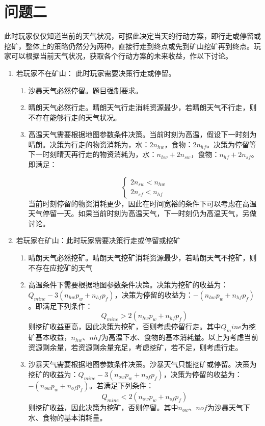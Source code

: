 \documentclass[withoutpre]{cumcmthesis} %
\begin{document}
\section{问题二}
此时玩家仅仅知道当前的天气状况，可据此决定当天的行动方案，即行走或停留或挖矿，整体上的策略仍然分为两种，直接行走到终点或先到矿山挖矿再到终点。玩家可以根据当前天气状况，获取各个行动方案的未来收益，作以下讨论。
\begin{enumerate}
    \item 若玩家不在矿山：
    此时玩家需要决策行走或停留。
    \begin{enumerate}
        \item 沙暴天气必然停留。题目强制要求。
        \item 晴朗天气必然行走。晴朗天气行走消耗资源最少，若晴朗天气不行走，则不存在能够行走的天气状况。
        \item 高温天气需要根据地图参数条件决策。当前时刻为高温，假设下一时刻为晴朗。决策为行走的物资消耗为，水：$2n_{hw}$，食物：$2n_{hf}$。决策为停留等下一时刻晴天再行走的物资消耗为，水：$n_{hw} + 2n_{sw}$，食物：$n_{hf} + 2n_{sf}$。即满足：

        \begin{equation}
            \left\{
                \begin{array}{lr}
                    2n_{sw} < n_{hw}   \\
                    2n_{sf} < n_{hf}
                \end{array}
            \right.
            \label{equa:1}
        \end{equation}
        当前时刻停留的物资消耗更少，因此在时间宽裕的条件下可以考虑在高温天气停留一天。如果当前时刻为高温天气，下一时刻仍为高温天气，另做讨论。
    \end{enumerate}
    \item 若玩家在矿山：此时玩家需要决策行走或停留或挖矿
    \begin{enumerate}
        \item 晴朗天气必然挖矿。晴朗天气挖矿消耗资源最少，若晴朗天气不挖矿，则不存在应挖矿的天气
        \item 高温条件下需要根据地图参数条件决策。决策为挖矿的收益为：$Q_{mine} - 3(n_{hw}p_w + n_{hf}p_f)$，决策为停留的收益为：$-(n_{hw}p_w + n_{hf}p_f)$。即满足下列条件：
        \begin{equation}
            Q_{mine} > 2(n_{hw}p_w + n_{hf}p_f)
            \label{equa:2}
        \end{equation}
        则挖矿收益更高，因此决策为挖矿，否则考虑停留行走。其中$Q_mine$为挖矿基本收益，$n_{hw}$、$n{hf}$为高温下水、食物的基本消耗量。以上为考虑当前资源剩余量，若资源剩余量充足，考虑挖矿，若不足，则考虑行走。
        \item 沙暴天气需要根据地图参数条件决策。沙暴天气只能挖矿或停留。决策为挖矿的收益为：$Q_{mine} - 3(n_{ow}p_w + n_{of}p_f)$，决策为停留的收益为：$-(n_{ow}p_w + n_{of}p_f)$。若满足下列条件：
        \begin{equation}
            Q_{mine} < 2(n_{ow}p_w + n_{of}p_f)
            \label{equa:3}
        \end{equation}
        则挖矿收益，因此决策为挖矿，否则停留。其中$n_{ow}$、$n{of}$为沙暴天气下水、食物的基本消耗量。
    \end{enumerate}
\end{enumerate}
\end{document}
